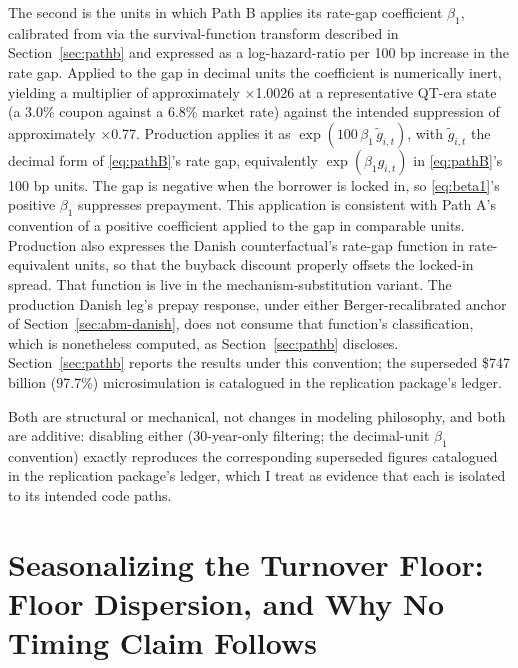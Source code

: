 \documentclass[12pt]{article}
\begin{document}
The second is the units in which Path B applies its rate-gap coefficient $\beta_1$, calibrated from \citet{liebersohn2024} via the survival-function transform described in Section~\ref{sec:pathb} and expressed as a log-hazard-ratio per 100 bp increase in the rate gap. Applied to the gap in decimal units the coefficient is numerically inert, yielding a multiplier of approximately $\times$1.0026 at a representative QT-era state (a 3.0\% coupon against a 6.8\% market rate) against the intended suppression of approximately $\times$0.77. Production applies it as $\exp(100\,\beta_1\,\tilde g_{i,t})$, with $\tilde g_{i,t}$ the decimal form of \eqref{eq:pathB}'s rate gap, equivalently $\exp(\beta_1 g_{i,t})$ in \eqref{eq:pathB}'s 100 bp units. The gap is negative when the borrower is locked in, so \eqref{eq:beta1}'s positive $\beta_1$ suppresses prepayment. This application is consistent with Path A's convention of a positive coefficient applied to the gap in comparable units. Production also expresses the Danish counterfactual's rate-gap function in rate-equivalent units, so that the buyback discount properly offsets the locked-in spread. That function is live in the mechanism-substitution variant. The production Danish leg's prepay response, under either Berger-recalibrated anchor of Section~\ref{sec:abm-danish}, does not consume that function's classification, which is nonetheless computed, as Section~\ref{sec:pathb} discloses. Section~\ref{sec:pathb} reports the results under this convention; the superseded \$747 billion (97.7\%) microsimulation is catalogued in the replication package's ledger.

Both are structural or mechanical, not changes in modeling philosophy, and both are additive: disabling either (30-year-only filtering; the decimal-unit $\beta_1$ convention) exactly reproduces the corresponding superseded figures catalogued in the replication package's ledger, which I treat as evidence that each is isolated to its intended code paths.

\section{Seasonalizing the Turnover Floor: Floor Dispersion, and Why No Timing Claim Follows}\label{sec:robustness-seasonalfloor}
\end{document}
